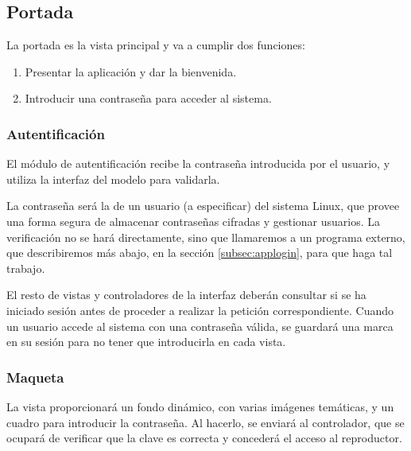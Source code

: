 \smallskip

\subsection{Portada}
\label{subsec:portada}

La portada es la vista principal y va a cumplir dos funciones:

\begin{enumerate}
	\item Presentar la aplicación y dar la bienvenida.
	\item Introducir una contraseña para acceder al sistema.
\end{enumerate}

\subsubsection{Autentificación}

El módulo de autentificación recibe la contraseña introducida por el usuario, y utiliza la interfaz del modelo para validarla.

La contraseña será la de un usuario (a especificar) del sistema Linux, que provee una forma segura de almacenar contraseñas cifradas y gestionar usuarios. La verificación no se hará directamente, sino que llamaremos a un programa externo, que describiremos más abajo, en la sección \ref{subsec:applogin}, para que haga tal trabajo.

El resto de vistas y controladores de la interfaz deberán consultar si se ha iniciado sesión antes de proceder a realizar la petición correspondiente. Cuando un usuario accede al sistema con una contraseña válida, se guardará una marca en su sesión para no tener que introducirla en cada vista.


\subsubsection{Maqueta}

La vista proporcionará un fondo dinámico, con varias imágenes temáticas, y un cuadro para introducir la contraseña. Al hacerlo, se enviará al controlador, que se ocupará de verificar que la clave es correcta y concederá el acceso al reproductor.

\smallskip

